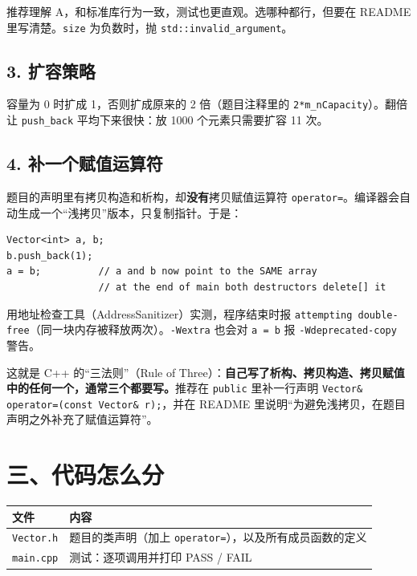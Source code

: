 \documentclass[11pt,a4paper]{article}
\newcommand{\code}[1]{\texttt{#1}}
\begin{document}
推荐理解 A，和标准库行为一致，测试也更直观。选哪种都行，但要在 README 里写清楚。\code{size} 为负数时，抛 \code{std::invalid\_argument}。

\subsection{3. 扩容策略}

容量为 0 时扩成 1，否则扩成原来的 2 倍（题目注释里的 \code{2*m\_nCapacity}）。翻倍让 \code{push\_back} 平均下来很快：放 1000 个元素只需要扩容 11 次。

\subsection{4. 补一个赋值运算符}

题目的声明里有拷贝构造和析构，却\textbf{没有}拷贝赋值运算符 \code{operator=}。编译器会自动生成一个“浅拷贝”版本，只复制指针。于是：

\begin{lstlisting}
Vector<int> a, b;
b.push_back(1);
a = b;          // a and b now point to the SAME array
                // at the end of main both destructors delete[] it
\end{lstlisting}

用地址检查工具（AddressSanitizer）实测，程序结束时报 \code{attempting double-free}（同一块内存被释放两次）。\code{-Wextra} 也会对 \code{a = b} 报 \code{-Wdeprecated-copy} 警告。

这就是 C++ 的“三法则”（Rule of Three）：\textbf{自己写了析构、拷贝构造、拷贝赋值中的任何一个，通常三个都要写。}推荐在 \code{public} 里补一行声明 \code{Vector\& operator=(const Vector\& r);}，并在 README 里说明“为避免浅拷贝，在题目声明之外补充了赋值运算符”。

\section{三、代码怎么分}

\begin{center}
\small
\begin{tabular}{@{}ll@{}}
\toprule
文件 & 内容 \\
\midrule
\code{Vector.h} & 题目的类声明（加上 \code{operator=}），以及所有成员函数的定义 \\
\code{main.cpp} & 测试：逐项调用并打印 PASS / FAIL \\
\bottomrule
\end{tabular}
\end{center}
\end{document}
